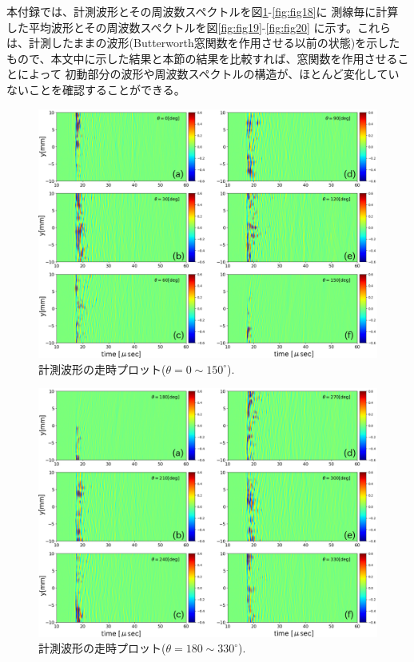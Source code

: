 本付録では、計測波形とその周波数スペクトルを図\ref{fig:fig15}-\ref{fig:fig18}に
測線毎に計算した平均波形とその周波数スペクトルを図\ref{fig:fig19}-\ref{fig:fig20}
に示す。これらは、計測したままの波形(Butterworth窓関数を作用させる以前の状態)を示した
もので、本文中に示した結果と本節の結果を比較すれば、窓関数を作用させることによって
初動部分の波形や周波数スペクトルの構造が、ほとんど変化していないことを確認することができる。
\begin{figure}[h]
	\begin{center}
	\includegraphics[width=1.0\linewidth]{Figs/fig15.eps} 
	\end{center}
	\caption{
		計測波形の走時プロット($\theta=0\sim 150^{\circ}$).
	} 
	\label{fig:fig15}
\end{figure}
\begin{figure}[h]
	\begin{center}
	\includegraphics[width=1.0\linewidth]{Figs/fig16.eps} 
	\end{center}
	\caption{
		計測波形の走時プロット($\theta=180\sim 330^{\circ}$).
	} 
	\label{fig:fig16}
\end{figure}
